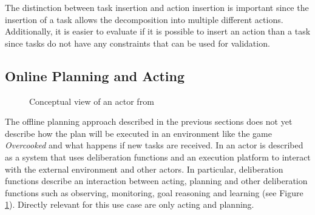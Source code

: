 The distinction between task insertion and action insertion is important since the insertion of a task allows the decomposition into multiple different actions.
Additionally, it is easier to evaluate if it is possible to insert an action than a task since tasks do not have any constraints that can be used for validation.




\subsection{Online Planning and Acting}\label{sec:acting}

\begin{figure}
  \centering
  \caption[Conceptual view of an actor]{Conceptual view of an actor from \cite{ghallabAutomatedPlanningActing2016}}
  \label{fig:background-acting-conceptual}
\end{figure}

The offline planning approach described in the previous sections does not yet describe how the plan will be executed in an environment like the game \textit{Overcooked} and what happens if new tasks are received.
In \cite{ghallabAutomatedPlanningActing2016} an actor is described as a system that uses deliberation functions and an execution platform to interact with the external environment and other actors.
In particular, deliberation functions describe an interaction between acting, planning and other deliberation functions such as observing, monitoring, goal reasoning and learning \citep{ingrandDeliberationAutonomousRobots2017} (see Figure \ref{fig:background-acting-conceptual}).
Directly relevant for this use case are only acting and planning.




